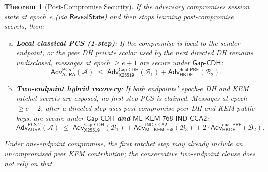 \documentclass[11pt,a4paper]{article}
\newtheorem{theorem}{Theorem}[section]
\theoremstyle{definition}
\theoremstyle{remark}
\newcommand{\adv}{\mathsf{Adv}}
\newcommand{\advA}{\mathcal{A}}
\newcommand{\advB}{\mathcal{B}}
\newcommand{\HKDF}{\mathsf{HKDF}}
\renewcommand{\DH}{\mathsf{X25519}}
\newcommand{\KEM}{\mathsf{ML\text{-}KEM\text{-}768}}
\newcommand{\GapCDH}{\mathsf{Gap\text{-}CDH}}
\newcommand{\INDCCA}{\mathsf{IND\text{-}CCA2}}
\newcommand{\dualPRF}{\mathsf{dual\text{-}PRF}}
\begin{document}
\begin{theorem}[Post-Compromise Security]
\label{thm:pcs}
If the adversary compromises session state at epoch~$e$ (via
$\mathsf{RevealState}$) and then stops learning post-compromise secrets, then:
\begin{enumerate}[(a)]
  \item \textbf{Local classical PCS (1-step)}: If the compromise is local to
        the sender endpoint, or the peer DH private scalar used by the next
        directed DH remains undisclosed, messages at epoch $\geq e{+}1$ are
        secure under $\GapCDH$:
        \[
          \adv^{\mathsf{PCS\text{-}1}}_{\mathsf{AURA}}(\advA)
          \;\leq\; \adv^{\GapCDH}_{\DH}(\advB_1) +
          \adv^{\dualPRF}_{\HKDF}(\advB_2).
        \]
  \item \textbf{Two-endpoint hybrid recovery}: If both endpoints' epoch-$e$
        DH and KEM ratchet secrets are exposed, no first-step PCS is claimed.
        Messages at epoch $\geq e{+}2$, after a directed step uses
        post-compromise peer DH and KEM public keys, are secure under
        $\GapCDH$ \textbf{and} $\KEM$-$\INDCCA$:
        \[
          \adv^{\mathsf{PCS\text{-}2}}_{\mathsf{AURA}}(\advA)
          \;\leq\; \adv^{\GapCDH}_{\DH}(\advB_1) +
          \adv^{\INDCCA}_{\KEM}(\advB_3) +
          2 \cdot \adv^{\dualPRF}_{\HKDF}(\advB_2).
        \]
\end{enumerate}
Under one-endpoint compromise, the first ratchet step may already include an
uncompromised peer KEM contribution; the conservative two-endpoint clause does
not rely on that.
\end{theorem}
\end{document}
